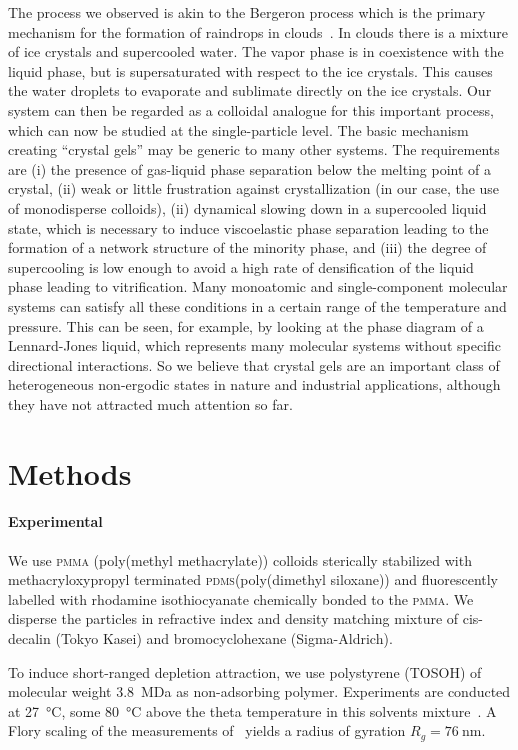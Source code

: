 \documentclass[twocolumn,showpacs,amsmath,amssymb,pre,superscriptaddress]{revtex4}
\begin{document}
The process we observed is akin to the Bergeron process which is the primary mechanism for the formation of raindrops in clouds~\cite{glickman2000glossary}.
In clouds there is a mixture of ice crystals and supercooled water. The vapor phase is in coexistence with the liquid phase, but is supersaturated
with respect to the ice crystals. This causes the water droplets to evaporate and sublimate directly on the ice crystals. Our system can then
be regarded as a colloidal analogue for this important process, which can now be studied at the single-particle level.
The basic mechanism creating ``crystal gels'' may be generic to many other
systems. The requirements are (i) the presence of gas-liquid phase separation below the melting point of a crystal, (ii) 
weak or little frustration against crystallization (in our case, the use of monodisperse colloids), 
(ii) dynamical slowing down in a supercooled liquid state, which is necessary to induce viscoelastic phase separation leading to the formation 
of a network structure of the minority phase, and (iii) the degree of supercooling is low enough to avoid a high rate of densification of the liquid phase 
leading to vitrification.   
Many monoatomic and single-component molecular systems can satisfy all these conditions in a certain range of the temperature and pressure. 
This can be seen, for example, by looking at the phase diagram of a Lennard-Jones liquid, which represents many molecular systems 
without specific directional interactions. So we believe that crystal gels are an important class of heterogeneous non-ergodic states in nature 
and industrial applications, although they have not attracted much attention so far.  

\section*{Methods}

\paragraph*{Experimental}
We use \textsc{pmma} (poly(methyl methacrylate)) colloids sterically stabilized with methacryloxypropyl terminated \textsc{pdms}(poly(dimethyl siloxane)) and fluorescently labelled with rhodamine isothiocyanate chemically bonded to the \textsc{pmma}. We disperse the particles in refractive index and density matching mixture of cis-decalin (Tokyo Kasei) and bromocyclohexane (Sigma-Aldrich).

To induce short-ranged depletion attraction, we use polystyrene (TOSOH) of molecular weight \SI{3.8}{\mega\dalton} as non-adsorbing polymer. Experiments are conducted at \SI{27}{\celsius}, some \SI{80}{\celsius} above the theta temperature in this solvents mixture~\cite{Royall2007}. A Flory scaling of the measurements of~\cite{lu2008gelation} yields a radius of gyration $R_g=\SI{76}{\nano\metre}$.
\end{document}
